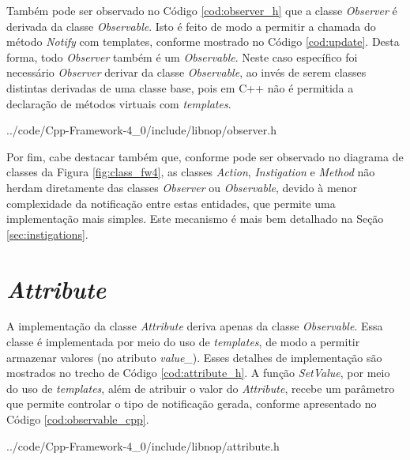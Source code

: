 \FloatBarrier

Também pode ser observado no Código \ref{cod:observer_h} que a classe
\textit{Observer} é derivada da classe \textit{Observable}. Isto é feito de modo
a permitir a chamada do método \textit{Notify} com templates, conforme mostrado
no Código \ref{cod:update}. Desta forma, todo \textit{Observer} também é um
\textit{Observable}. Neste caso específico foi necessário \textit{Observer}
derivar da classe \textit{Observable}, ao invés de serem classes distintas
derivadas de uma classe base, pois em C++ não é permitida a declaração de
métodos virtuais com \textit{templates}.


            {../code/Cpp-Framework-4_0/include/libnop/observer.h}
\FloatBarrier

Por fim, cabe destacar também que, conforme pode ser observado no diagrama de
classes da Figura \ref{fig:class_fw4}, as classes \textit{Action},
\textit{Instigation} e \textit{Method} não herdam diretamente das classes
\textit{Observer} ou \textit{Observable}, devido à menor complexidade da
notificação entre estas entidades, que permite uma implementação mais simples.
Este mecanismo é mais bem detalhado na Seção \ref{sec:instigations}.

\section{\textit{Attribute}}

A implementação da classe \textit{Attribute} deriva apenas da classe
\textit{Observable}. Essa classe é implementada por meio do uso de
\textit{templates}, de modo a permitir armazenar valores (no atributo
\textit{value\_}). Esses detalhes de implementação são mostrados no trecho de
Código \ref{cod:attribute_h}. A função \textit{SetValue}, por meio do uso de
\textit{templates}, além de atribuir o valor do \textit{Attribute}, recebe um
parâmetro que permite controlar o tipo de notificação gerada, conforme
apresentado no Código \ref{cod:observable_cpp}.


            {../code/Cpp-Framework-4_0/include/libnop/attribute.h}
\FloatBarrier

